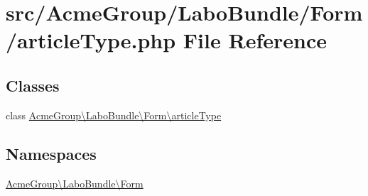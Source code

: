 \hypertarget{article_type_8php}{\section{src/\+Acme\+Group/\+Labo\+Bundle/\+Form/article\+Type.php File Reference}
\label{article_type_8php}
}
\subsection*{Classes}
\begin{DoxyCompactItemize}
\item 
class \hyperlink{class_acme_group_1_1_labo_bundle_1_1_form_1_1article_type}{Acme\+Group\textbackslash{}\+Labo\+Bundle\textbackslash{}\+Form\textbackslash{}article\+Type}
\end{DoxyCompactItemize}
\subsection*{Namespaces}
\begin{DoxyCompactItemize}
\item 
 \hyperlink{namespace_acme_group_1_1_labo_bundle_1_1_form}{Acme\+Group\textbackslash{}\+Labo\+Bundle\textbackslash{}\+Form}
\end{DoxyCompactItemize}
